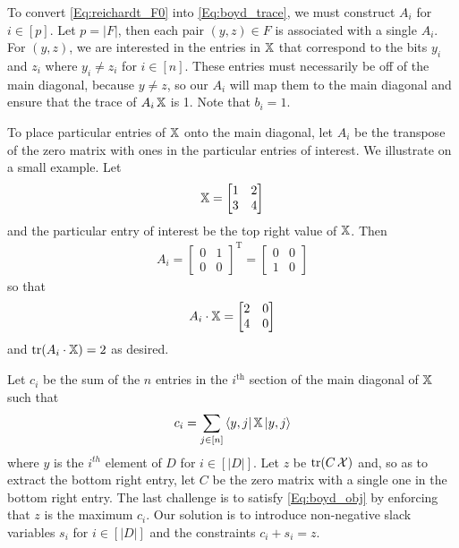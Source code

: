 To convert \cref{Eq:reichardt_F0} into \cref{Eq:boyd_trace},
we must construct $A_i$ for $i \in [p]$.
Let $p = |F|$, then each pair $(y,z) \in F$
is associated with a single $A_i$.
For $(y,z)$, we are interested in the entries
in $\operatorname{\mathbb{X}}$ that correspond to the bits $y_i$ and $z_i$
where $y_i \neq z_i$ for $i \in [n]$.
These entries must necessarily be off of the main diagonal,
because $y\neq z$,
so our $A_i$ will map them to the main diagonal 
and ensure that the trace of $A_i \operatorname{\mathbb{X}}$ is 1.
Note that $b_i = 1$.

To place particular entries of $\operatorname{\mathbb{X}}$ onto the main diagonal,
let $A_i$ be the transpose of the zero matrix with
ones in the particular entries of interest.
We illustrate on a small example.
Let
\begin{align}
    \operatorname{\mathbb{X}} = \left[ \begin{matrix} 1 & 2 \\ 3 & 4 \end{matrix} \right] \nonumber
\end{align}
and the particular entry of interest be the top right value of $\operatorname{\mathbb{X}}$.
Then
\begin{align}
    A_i = \left[ \begin{matrix} 0 & 1 \\ 0 & 0 \end{matrix} \right]^\textrm{T} \nonumber
    = \left[ \begin{matrix} 0 & 0 \\ 1 & 0 \end{matrix} \right] \nonumber
\end{align}
so that
\begin{align}
    A_i \cdot \operatorname{\mathbb{X}} = \left[ \begin{matrix} 2 & 0 \\ 4 & 0 \end{matrix} \right] \nonumber
\end{align}
and $\operatorname{\text{tr}}(A_i \cdot \operatorname{\mathbb{X}}) = 2$ as desired.

Let $c_i$ be the sum of the $n$ entries
in the $i^\mathrm{th}$ section of the main diagonal of $\operatorname{\mathbb{X}}$
such that
\begin{align}
    c_i = \sum_{j \in [n]} \bra{y,j}\operatorname{\mathbb{X}}\ket{y,j}
    \nonumber
\end{align} 
where $y$ is the $i^{th}$ element of $D$ for
$i \in [|D|]$.
Let $z$ be $\operatorname{\text{tr}}(C\operatorname{\mathcal{X}})$ and, so as to extract the bottom right entry,
let $C$ be the zero matrix with a single one in the bottom right entry.
The last challenge is to satisfy \cref{Eq:boyd_obj}
by enforcing that $z$ is the maximum $c_i$.
Our solution is to introduce non-negative slack variables
$s_i$ for $i \in [|D|]$ and the constraints
$c_i + s_i = z$.

